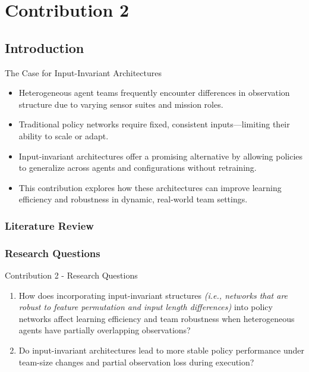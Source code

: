 \section{Contribution 2}


\subsection{Introduction}

\begin{frame}{The Case for Input-Invariant Architectures}
    \begin{itemize}
        \item Heterogeneous agent teams frequently encounter differences in observation 
            structure due to varying sensor suites and mission roles.
        \item Traditional policy networks require fixed, consistent inputs—limiting their 
            ability to scale or adapt.
        \item Input-invariant architectures offer a promising alternative by allowing 
            policies to generalize across agents and configurations without retraining.
        \item This contribution explores how these architectures can improve learning 
            efficiency and robustness in dynamic, real-world team settings.
    \end{itemize}
\end{frame}

\subsubsection{Literature Review}




\subsubsection{Research Questions}

\begin{frame}{Contribution 2 - Research Questions}
    \begin{enumerate}
        \item[RQ 1] {
            How does incorporating input-invariant structures \emph{(i.e., networks 
            that are robust to feature permutation and input length differences)}
            into policy networks affect learning efficiency and team robustness 
            when heterogeneous agents have partially overlapping observations?
            }
        \item[RQ 2] {
            Do input-invariant architectures lead to more stable policy performance under 
            team-size changes and partial observation loss during execution?
            }
    \end{enumerate}
\end{frame}

